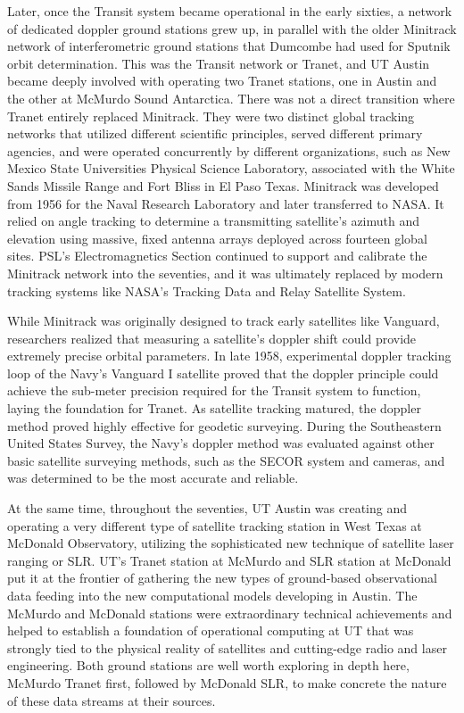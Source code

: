 Later, once the Transit system became operational in the early sixties, a network of dedicated doppler ground stations grew up, in parallel with the older Minitrack network of interferometric ground stations that Dumcombe had used for Sputnik orbit determination. This was the Transit network or Tranet, and UT Austin became deeply involved with operating two Tranet stations, one in Austin and the other at McMurdo Sound Antarctica. There was not a direct transition where Tranet entirely replaced Minitrack. They were two distinct global tracking networks that utilized different scientific principles, served different primary agencies, and were operated concurrently by different organizations, such as New Mexico State Universities Physical Science Laboratory, associated with the White Sands Missile Range and Fort Bliss in El Paso Texas. Minitrack was developed from 1956 for the Naval Research Laboratory and later transferred to NASA. It relied on angle tracking to determine a transmitting satellite's azimuth and elevation using massive, fixed antenna arrays deployed across fourteen global sites. PSL's Electromagnetics Section continued to support and calibrate the Minitrack network into the seventies, and it was ultimately replaced by modern tracking systems like NASA's Tracking Data and Relay Satellite System.

While Minitrack was originally designed to track early satellites like Vanguard, researchers realized that measuring a satellite's doppler shift could provide extremely precise orbital parameters. In late 1958, experimental doppler tracking loop of the Navy’s Vanguard I satellite proved that the doppler principle could achieve the sub-meter precision required for the Transit system to function, laying the foundation for Tranet. As satellite tracking matured, the doppler method proved highly effective for geodetic surveying. During the Southeastern United States Survey, the Navy's doppler method was evaluated against other basic satellite surveying methods, such as the SECOR system and cameras, and was determined to be the most accurate and reliable.

At the same time, throughout the seventies, UT Austin was creating and operating a very different type of satellite tracking station in West Texas at McDonald Observatory, utilizing the sophisticated new technique of satellite laser ranging or SLR. UT’s Tranet station at McMurdo and SLR station at McDonald put it at the frontier of gathering the new types of ground-based observational data feeding into the new computational models developing in Austin. The McMurdo and McDonald stations were extraordinary technical achievements and helped to establish a foundation of operational computing at UT that was strongly tied to the physical reality of satellites and cutting-edge radio and laser engineering. Both ground stations are well worth exploring in depth here, McMurdo Tranet first, followed by McDonald SLR, to make concrete the nature of these data streams at their sources.

